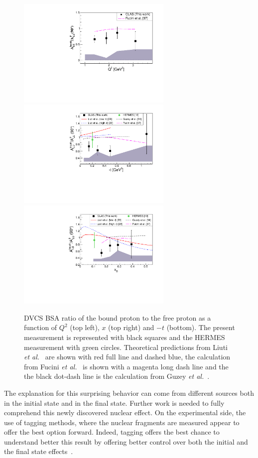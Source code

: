 \documentclass[aps,prc,preprint,superscriptaddress]{revtex4}
\begin{document}
\begin{figure}[tbp!]
\center
\includegraphics[width=7.4cm]{fig3/ALU_ratioInc_Q2_shortscenrario.pdf}
\includegraphics[width=7.4cm]{fig3/ALU_ratioInc_t_shortscenrario.pdf}
\includegraphics[width=7.4cm]{fig3/ALU_ratioInc_x_shortscenrario.pdf}
	\caption{DVCS BSA ratio of the bound proton to the free proton as a function of 
	$Q^2$ (top left), $x$ (top right) and $-t$ (bottom). The present measurement is 
	represented with black squares and the HERMES 
	measurement \cite{Airapetian:2009cga} with green circles. Theoretical predictions 
	from Liuti {\it et al.}~\cite{Liuti:2005gi,GonzalezHernandez:2012jv} are shown 
	with red full line and dashed blue, the calculation from Fucini 
	{\it et al.}~\cite{Fucini:2019xlc} is shown with a magenta long dash line and the
	the black dot-dash line is the calculation from Guzey {\it et al.}~\cite{Guzey:2008th}.}
\label{fig:IncRatios}
\end{figure}

The explanation for this surprising behavior can come from different sources
both in the initial state and in the final state. 
Further work is needed to fully comprehend this newly discovered nuclear effect. On the 
experimental side, the use of tagging methods, where the nuclear fragments are measured
appear to offer the best option forward. Indeed, tagging offers the best chance to understand better
this result by offering better control over both the initial and the final state 
effects~\cite{Dupre:2015jha}.
\end{document}
